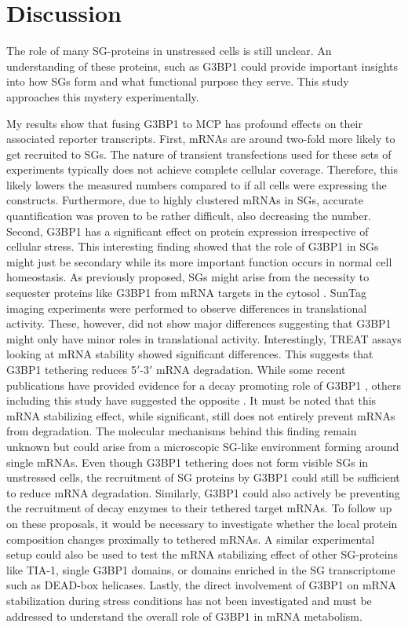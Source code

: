 \chapter{Discussion}


The role of many SG-proteins in unstressed cells is still unclear.
An understanding of these proteins, such as G3BP1 could provide important insights into how SGs form and what functional purpose they serve.
This study approaches this mystery experimentally.

My results show that fusing G3BP1 to MCP has profound effects on their associated reporter transcripts.
First, mRNAs are around two-fold more likely to get recruited to SGs.
The nature of transient transfections used for these sets of experiments typically does not achieve complete cellular coverage.
Therefore, this likely lowers the measured numbers compared to if all cells were expressing the constructs.
Furthermore, due to highly clustered mRNAs in SGs, accurate quantification was proven to be rather difficult, also decreasing the number.
Second, G3BP1 has a significant effect on protein expression irrespective of cellular stress.
This interesting finding showed that the role of G3BP1 in SGs might just be secondary while its more important function occurs in normal cell homeostasis.
As previously proposed, SGs might arise from the necessity to sequester proteins like G3BP1 from mRNA targets in the cytosol \cite{fischer_structure-mediated_2020}.
SunTag imaging experiments were performed to observe differences in translational activity.
These, however, did not show major differences suggesting that G3BP1 might only have minor roles in translational activity.
Interestingly, TREAT assays looking at mRNA stability showed significant differences.
This suggests that G3BP1 tethering reduces 5$'$-3$'$ mRNA degradation.
While some recent publications have provided evidence for a decay promoting role of G3BP1 \cite{fischer_structure-mediated_2020, tourriere_rasgap-associated_2001}, others including this study have suggested the opposite \cite{aulas_g3bp1_2015, bley_stress_2015, laver_rna-binding_2020}.
It must be noted that this mRNA stabilizing effect, while significant, still does not entirely prevent mRNAs from degradation.
The molecular mechanisms behind this finding remain unknown but could arise from a microscopic SG-like environment forming around single mRNAs.
Even though G3BP1 tethering does not form visible SGs in unstressed cells, the recruitment of SG proteins by G3BP1 could still be sufficient to reduce mRNA degradation.
Similarly, G3BP1 could also actively be preventing the recruitment of decay enzymes to their tethered target mRNAs.
To follow up on these proposals, it would be necessary to investigate whether the local protein composition changes proximally to tethered mRNAs.
A similar experimental setup could also be used to test the mRNA stabilizing effect of other SG-proteins like TIA-1, single G3BP1 domains, or domains enriched in the SG transcriptome such as DEAD-box helicases.
Lastly, the direct involvement of G3BP1 on mRNA stabilization during stress conditions has not been investigated and must be addressed to understand the overall role of G3BP1 in mRNA metabolism.

